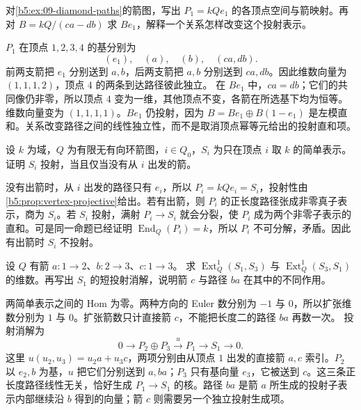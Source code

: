 \begin{exercise}\label{b5:ex:09-diamond-projective}
	对\cref{b5:ex:09-diamond-paths}的箭图，写出 \(P_1=kQe_1\) 的各顶点空间与箭映射。再对 \(B=kQ/(ca-db)\) 求 \(Be_1\)，解释一个关系怎样改变这个投射表示。
\end{exercise}
\begin{solution}
	\(P_1\) 在顶点 \(1,2,3,4\) 的基分别为
	\[
		(e_1),\quad(a),\quad(b),\quad(ca,db).
	\]
	前两支箭把 \(e_1\) 分别送到 \(a,b\)，后两支箭把 \(a,b\) 分别送到 \(ca,db\)。因此维数向量为 \((1,1,1,2)\)，顶点 \(4\) 的两条到达路径彼此独立。 在 \(Be_1\) 中，\(ca=db\)；它们的共同像仍非零，所以顶点 \(4\) 变为一维，其他顶点不变，各箭在所选基下均为恒等。维数向量变为 \((1,1,1,1)\)。\(Be_1\) 仍投射，因为 \(B=Be_1\oplus B(1-e_1)\) 是左模直和。关系改变路径之间的线性独立性，而不是取消顶点幂等元给出的投射直和项。
\end{solution}

\begin{exercise}\label{b5:ex:09-projective-simple-sinks}
	设 \(k\) 为域，\(Q\) 为有限无有向环箭图，\(i\in Q_0\)，\(S_i\) 为只在顶点 \(i\) 取 \(k\) 的简单表示。证明 \(S_i\) 投射，当且仅当没有从 \(i\) 出发的箭。
\end{exercise}
\begin{solution}
	没有出箭时，从 \(i\) 出发的路径只有 \(e_i\)，所以 \(P_i=kQe_i=S_i\)，投射性由\cref{b5:prop:vertex-projective}给出。若有出箭，则 \(P_i\) 的正长度路径张成非零真子表示，商为 \(S_i\)。若 \(S_i\) 投射，满射 \(P_i\to S_i\) 就会分裂，使 \(P_i\) 成为两个非零子表示的直和。可是同一命题已经证明 \(\operatorname{End}_Q(P_i)=k\)，所以 \(P_i\) 不可分解，矛盾。因此有出箭时 \(S_i\) 不投射。
\end{solution}

\begin{exercise}\label{b5:ex:09-ext-arrows-not-paths}
	设 \(Q\) 有箭 \(a:1\to2\)、\(b:2\to3\)、\(c:1\to3\)。 求 \(\operatorname{Ext}^1_Q(S_1,S_3)\) 与 \(\operatorname{Ext}^1_Q(S_3,S_1)\) 的维数。再写出 \(S_1\) 的短投射消解，说明箭 \(c\) 与路径 \(ba\) 在其中的不同作用。
\end{exercise}
\begin{solution}
	两简单表示之间的 Hom 为零。两种方向的 Euler 数分别为 \(-1\) 与 \(0\)，所以扩张维数分别为 \(1\) 与 \(0\)。扩张箭数只计直接箭 \(c\)，不能把长度二的路径 \(ba\) 再数一次。 投射消解为
	\[
		0\longrightarrow P_2\oplus P_3 \xrightarrow{u}P_1\longrightarrow S_1\longrightarrow0.
	\]
	这里 \(u(u_2,u_3)=u_2a+u_3c\)，两项分别由从顶点 \(1\) 出发的直接箭 \(a,c\) 索引。\(P_2\) 以 \(e_2,b\) 为基，\(u\) 把它们分别送到 \(a,ba\)；\(P_3\) 只有基向量 \(e_3\)，它被送到 \(c\)。这三条正长度路径线性无关，恰好生成 \(P_1\to S_1\) 的核。路径 \(ba\) 是箭 \(a\) 所生成的投射子表示内部继续沿 \(b\) 得到的向量；箭 \(c\) 则需要另一个独立投射生成项。
\end{solution}

